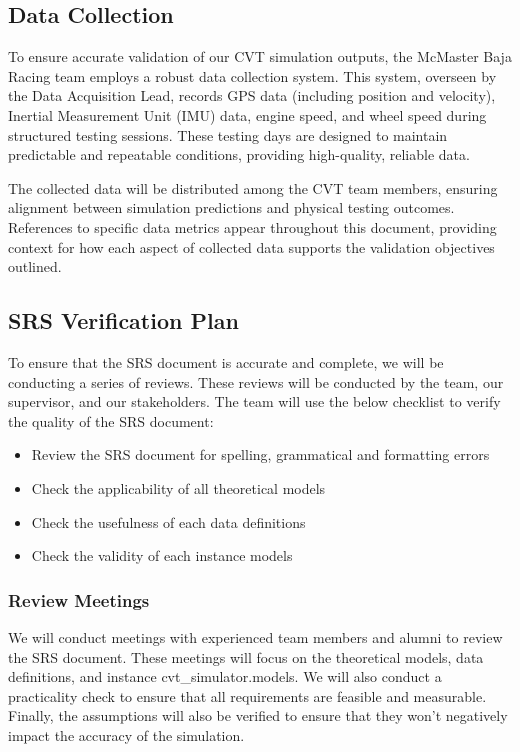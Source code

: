 \documentclass[12pt, titlepage]{article}
\begin{document}
\subsection{Data Collection}

\noindent To ensure accurate validation of our CVT simulation outputs, the McMaster Baja Racing team employs a robust data collection system. This system, overseen by the Data Acquisition Lead, records GPS data (including position and velocity), Inertial Measurement Unit (IMU) data, engine speed, and wheel speed during structured testing sessions. These testing days are designed to maintain predictable and repeatable conditions, providing high-quality, reliable data.

The collected data will be distributed among the CVT team members, ensuring alignment between simulation predictions and physical testing outcomes. References to specific data metrics appear throughout this document, providing context for how each aspect of collected data supports the validation objectives outlined.
\subsection{SRS Verification Plan}

\noindent To ensure that the SRS document is accurate and complete, we will be conducting a series of reviews.
These reviews will be conducted by the team, our supervisor, and our stakeholders.
The team will use the below checklist to verify the quality of the SRS document:
\begin{itemize}
  \item Review the SRS document for spelling, grammatical and formatting errors
  \item Check the applicability of all theoretical models
  \item Check the usefulness of each data definitions
  \item Check the validity of each instance models
\end{itemize}

\subsubsection*{Review Meetings}
We will conduct meetings with experienced team members and alumni to review the SRS document.
These meetings will focus on the theoretical models, data definitions, and instance cvt_simulator.models.
We will also conduct a practicality check to ensure that all requirements are feasible and measurable.
Finally, the assumptions will also be verified to ensure that they won't negatively impact the accuracy of the simulation.
\end{document}
